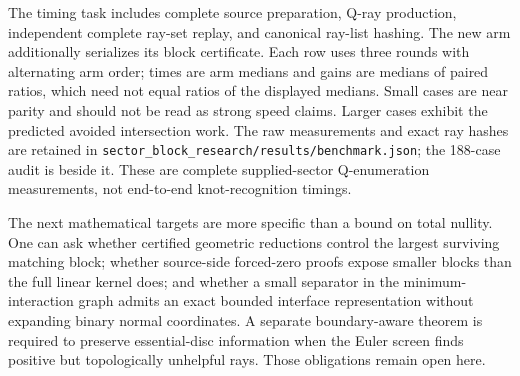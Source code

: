 The timing task includes complete source preparation, Q-ray production,
independent complete ray-set replay, and canonical ray-list hashing.
The new arm additionally serializes its block certificate.  Each row uses
three rounds with alternating arm order; times are arm medians and gains
are medians of paired ratios, which need not equal ratios of the displayed
medians.  Small cases are near parity and should not be read as strong
speed claims.  Larger cases exhibit the predicted avoided intersection
work.  The raw measurements and exact ray hashes are retained in
\texttt{sector\_block\_research/results/benchmark.json}; the 188-case audit
is beside it.  These are complete supplied-sector Q-enumeration measurements,
not end-to-end knot-recognition timings.

The next mathematical targets are more specific than a bound on total
nullity.  One can ask whether certified geometric reductions control the
largest surviving matching block; whether source-side forced-zero proofs
expose smaller blocks than the full linear kernel does; and whether a
small separator in the minimum-interaction graph admits an exact bounded
interface representation without expanding binary normal coordinates.
A separate boundary-aware theorem is required to preserve essential-disc
information when the Euler screen finds positive but topologically
unhelpful rays.  Those obligations remain open here.
